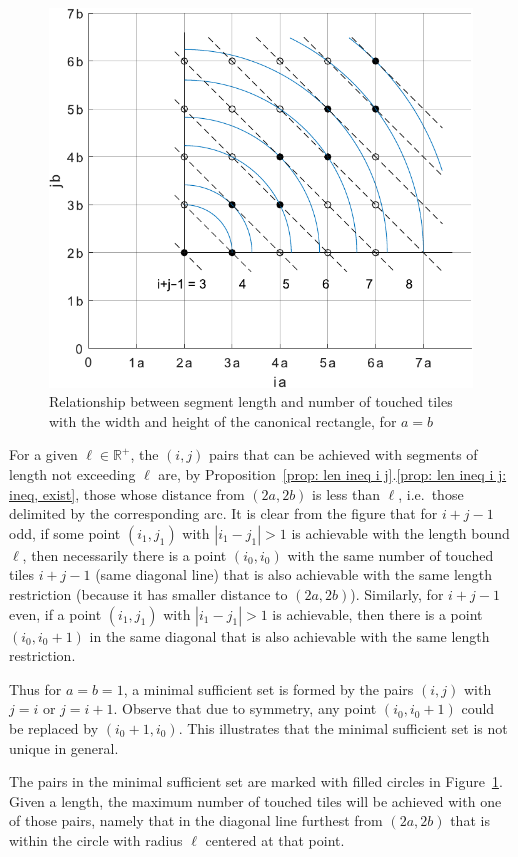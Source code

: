 \documentclass[12pt, a4paper]{article}
\newcommand{\len}{\ell} %
\begin{document}
\begin{figure}
\centering%
\includegraphics[width=.7\textwidth]{ijLS_1}%
\caption{Relationship between segment length and number of touched tiles with the width and height of the canonical rectangle, for $a=b$
}%
\label{fig: ijLS_1}%
\end{figure}%

For a given $\len \in \mathbb R^+$, the $(i,j)$ pairs that can be achieved with segments of length not exceeding $\len$ are, by Proposition~\ref{prop: len ineq i j}.\ref{prop: len ineq i j: ineq, exist}, those whose distance from $(2a,2b)$ is less than $\len$, i.e.~those delimited by the corresponding arc. It is clear from the figure that for $i+j-1$ odd, if some point $(i_1,j_1)$ with $|i_1-j_1|>1$ is achievable with the length bound $\len$, then necessarily there is a point $(i_0,i_0)$ with the same number of touched tiles $i+j-1$ (same diagonal line) that is also achievable with the same length restriction (because it has smaller distance to $(2a,2b)$). Similarly, for $i+j-1$ even, if a point $(i_1,j_1)$ with $|i_1-j_1|>1$ is achievable, then there is a point $(i_0,i_0+1)$ in the same diagonal that is also achievable with the same length restriction.

Thus for $a=b=1$, a minimal sufficient set is formed by the pairs $(i,j)$ with $j=i$ or $j=i+1$. Observe that due to symmetry, any point $(i_0,i_0+1)$ could be replaced by $(i_0+1,i_0)$. This illustrates that the minimal sufficient set is not unique in general. 

The pairs in the minimal sufficient set are marked with filled circles in Figure~\ref{fig: ijLS_1}. Given a length, the maximum number of touched tiles will be achieved with one of those pairs, namely that in the diagonal line furthest from $(2a,2b)$ that is within the circle with radius $\len$ centered at that point.
\end{document}

